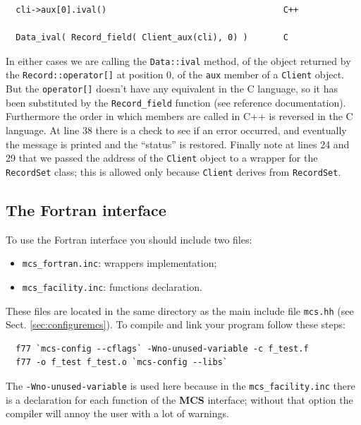 \documentclass[12pt,titlepage]{article}
\newcommand{\mcs}{\textbf{MCS} }
\begin{document}
\begin{verbatim}
  cli->aux[0].ival()                                   C++

  Data_ival( Record_field( Client_aux(cli), 0) )       C
\end{verbatim}

\noindent In either cases we are calling the \verb|Data::ival| method,
of the object returned by the \verb|Record::operator[]| at position 0,
of the \verb|aux| member of a \verb|Client| object. But the
\verb|operator[]| doesn't have any equivalent in the C language, so it
has been substituted by the \verb|Record_field| function (see
reference documentation). Furthermore the order in which members are
called in C++ is reversed in the C language. At line 38 there is a
check to see if an error occurred, and eventually the message is
printed and the ``status'' is restored. Finally note at lines 24 and
29 that we passed the address of the \verb|Client| object to a wrapper
for the \verb|RecordSet| class; this is allowed only because
\verb|Client| derives from \verb|RecordSet|.

%
\subsection{The Fortran interface}
\label{sec-The Fortran interface}
To use the Fortran interface you should include two files:
\begin{itemize}
\item \verb|mcs_fortran.inc|: wrappers implementation;
\item \verb|mcs_facility.inc|: functions declaration.
\end{itemize}
\noindent These files are located in the same directory as the main
include file \verb|mcs.hh| (see Sect. \ref{sec:configuremcs}). To
compile and link your program follow these steps:
%
\begin{verbatim}
  f77 `mcs-config --cflags` -Wno-unused-variable -c f_test.f
  f77 -o f_test f_test.o `mcs-config --libs`
\end{verbatim}

\noindent The \verb|-Wno-unused-variable| is used here because in the
\verb|mcs_facility.inc| there is a declaration for each function of
the \mcs interface; without that option the compiler will annoy the user
with a lot of warnings.
%
\end{document}

